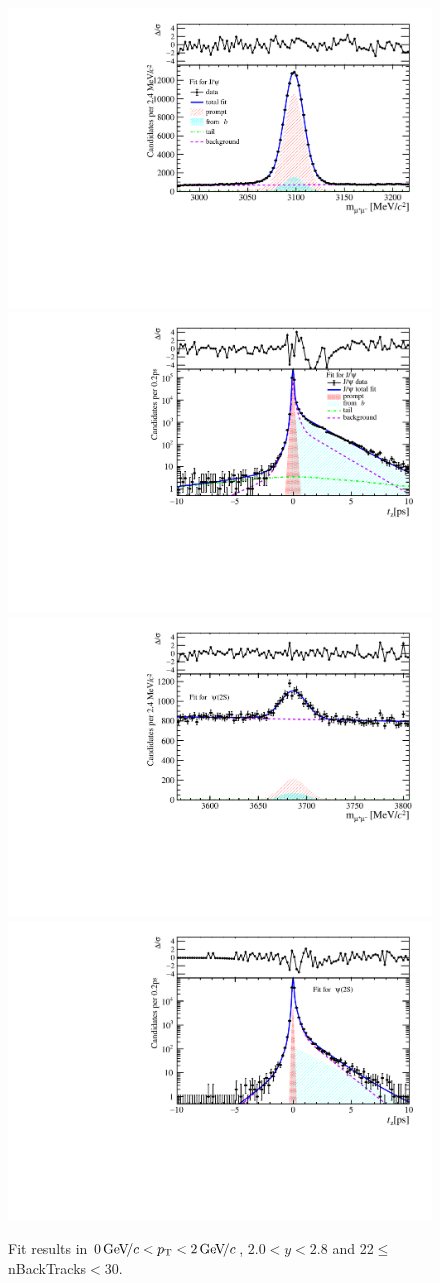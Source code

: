 \begin{figure}[H]
\begin{center}
\includegraphics[width=0.47\linewidth]{pdf/Jpsi/drawmassB/n4y1pt1.pdf}
\includegraphics[width=0.47\linewidth]{pdf/Jpsi/2DFitB/n4y1pt1.pdf}
\vspace*{-0.5cm}
\includegraphics[width=0.47\linewidth]{pdf/Psi2S/drawmassB/n4y1pt1.pdf}
\includegraphics[width=0.47\linewidth]{pdf/Psi2S/2DFitB/n4y1pt1.pdf}
\vspace*{-0.5cm}
\end{center}
\caption{Fit results in $0\text{\,Ge\kern -0.1em V\!/}c<p_{\mathrm{T}}<2\text{\,Ge\kern -0.1em V\!/}c$, $2.0<y<2.8$ and 22$\leq$nBackTracks$<$30.}
\label{Fitn4y1pt1}
\end{figure}
